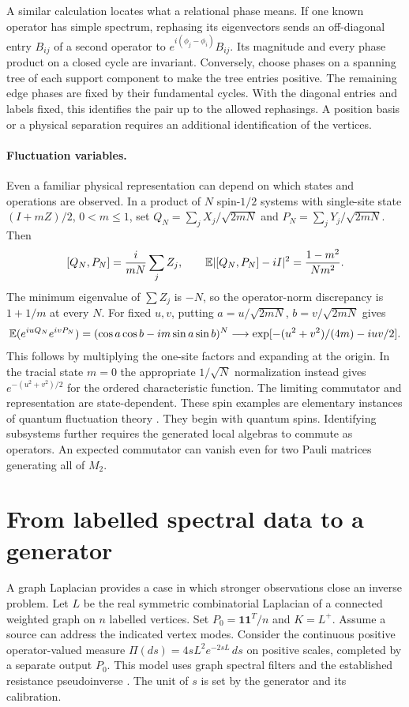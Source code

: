 \documentclass[11pt,letterpaper]{article}
\begin{document}
A similar calculation locates what a relational phase means. If one known operator has simple spectrum, rephasing its eigenvectors sends an off-diagonal entry $B_{ij}$ of a second operator to $e^{i(\phi_j-\phi_i)}B_{ij}$. Its magnitude and every phase product on a closed cycle are invariant. Conversely, choose phases on a spanning tree of each support component to make the tree entries positive. The remaining edge phases are fixed by their fundamental cycles. With the diagonal entries and labels fixed, this identifies the pair up to the allowed rephasings. A position basis or a physical separation requires an additional identification of the vertices.

\paragraph{Fluctuation variables.}
Even a familiar physical representation can depend on which states and operations are observed. In a product of $N$ spin-$1/2$ systems with single-site state $(I+mZ)/2$, $0<m\le1$, set $Q_N=\sum_j X_j/\sqrt{2mN}$ and $P_N=\sum_jY_j/\sqrt{2mN}$. Then
\[
 [Q_N,P_N]=\frac{i}{mN}\sum_j Z_j,\qquad
 \mathbb E|[Q_N,P_N]-iI|^2=\frac{1-m^2}{Nm^2}.
\]
The minimum eigenvalue of $\sum Z_j$ is $-N$, so the operator-norm discrepancy is $1+1/m$ at every $N$. For fixed $u,v$, putting $a=u/\sqrt{2mN}$, $b=v/\sqrt{2mN}$ gives
\[
 \mathbb E(e^{iuQ_N}e^{ivP_N})=(\cos a\cos b-im\sin a\sin b)^N
 \longrightarrow \exp[-(u^2+v^2)/(4m)-iuv/2].
\]
This follows by multiplying the one-site factors and expanding at the origin. In the tracial state $m=0$ the appropriate $1/\sqrt N$ normalization instead gives $e^{-(u^2+v^2)/2}$ for the ordered characteristic function. The limiting commutator and representation are state-dependent. These spin examples are elementary instances of quantum fluctuation theory \cite{fluct}. They begin with quantum spins. Identifying subsystems further requires the generated local algebras to commute as operators. An expected commutator can vanish even for two Pauli matrices generating all of $M_2$.

\section{From labelled spectral data to a generator}\label{sec:graph}

A graph Laplacian provides a case in which stronger observations close an inverse problem. Let $L$ be the real symmetric combinatorial Laplacian of a connected weighted graph on $n$ labelled vertices. Set $P_0=\mathbf 1\mathbf 1^T/n$ and $K=L^+$. Assume a source can address the indicated vertex modes. Consider the continuous positive operator-valued measure $\Pi(ds)=4sL^2e^{-2sL}\,ds$ on positive scales, completed by a separate output $P_0$. This model uses graph spectral filters and the established resistance pseudoinverse \cite{hammond,devriendt}. The unit of $s$ is set by the generator and its calibration.
\end{document}
